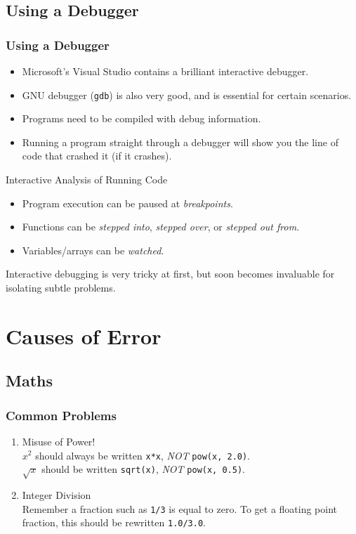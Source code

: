 \documentclass[smaller,handout,table]{beamer}
\begin{document}
\subsection{Using a Debugger}
\begin{frame}
\frametitle{Using a Debugger}
\begin{itemize}
\item Microsoft's Visual Studio contains a brilliant interactive debugger.
\item GNU debugger ({\tt gdb}) is also very good, and is essential for certain scenarios.
\item Programs need to be compiled with debug information.
\item Running a program straight through a debugger will show you the line of code that crashed it (if it crashes).
\end{itemize}

\begin{exampleblock}{Interactive Analysis of Running Code}
\begin{itemize}
\item Program execution can be paused at \emph{breakpoints}.
\item Functions can be \emph{stepped into}, \emph{stepped over}, or
\emph{stepped out from}.
\item Variables/arrays can be \emph{watched}.
\end{itemize}
\end{exampleblock}

\begin{alertblock}{}
Interactive debugging is very tricky at first, but soon becomes invaluable for isolating subtle problems.
\end{alertblock}
\end{frame}


\section{Causes of Error}

\subsection{Maths}
\begin{frame}
\frametitle{Common Problems}
\begin{enumerate}
\item Misuse of Power!\\
$x^2$ should always be written {\tt x*x}, \emph{NOT} {\tt pow(x, 2.0)}.\\
$\sqrt{x}$ should be written {\tt sqrt(x)}, \emph{NOT} {\tt pow(x, 0.5)}.
\item Integer Division\\
Remember a fraction such as {\tt 1/3} is equal to zero. To get a floating point fraction, this should be rewritten {\tt 1.0/3.0}.
\end{enumerate}
\end{frame}
\end{document}
